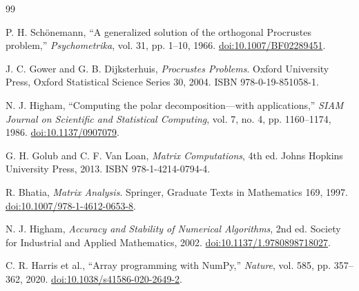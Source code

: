 {}
\begin{thebibliography}{99}
\raggedright

P. H. Sch\"onemann,
``A generalized solution of the orthogonal Procrustes problem,''
\emph{Psychometrika}, vol. 31, pp. 1--10, 1966.
\href{https://doi.org/10.1007/BF02289451}{doi:10.1007/BF02289451}.

J. C. Gower and G. B. Dijksterhuis,
\emph{Procrustes Problems}.
Oxford University Press, Oxford Statistical Science Series 30, 2004.
ISBN 978-0-19-851058-1.

N. J. Higham,
``Computing the polar decomposition---with applications,''
\emph{SIAM Journal on Scientific and Statistical Computing}, vol. 7, no. 4,
pp. 1160--1174, 1986.
\href{https://doi.org/10.1137/0907079}{doi:10.1137/0907079}.

G. H. Golub and C. F. Van Loan,
\emph{Matrix Computations}, 4th ed.
Johns Hopkins University Press, 2013.
ISBN 978-1-4214-0794-4.

R. Bhatia,
\emph{Matrix Analysis}.
Springer, Graduate Texts in Mathematics 169, 1997.
\href{https://doi.org/10.1007/978-1-4612-0653-8}{doi:10.1007/978-1-4612-0653-8}.

N. J. Higham,
\emph{Accuracy and Stability of Numerical Algorithms}, 2nd ed.
Society for Industrial and Applied Mathematics, 2002.
\href{https://doi.org/10.1137/1.9780898718027}{doi:10.1137/1.9780898718027}.

C. R. Harris et al.,
``Array programming with NumPy,''
\emph{Nature}, vol. 585, pp. 357--362, 2020.
\href{https://doi.org/10.1038/s41586-020-2649-2}{doi:10.1038/s41586-020-2649-2}.

\end{thebibliography}
